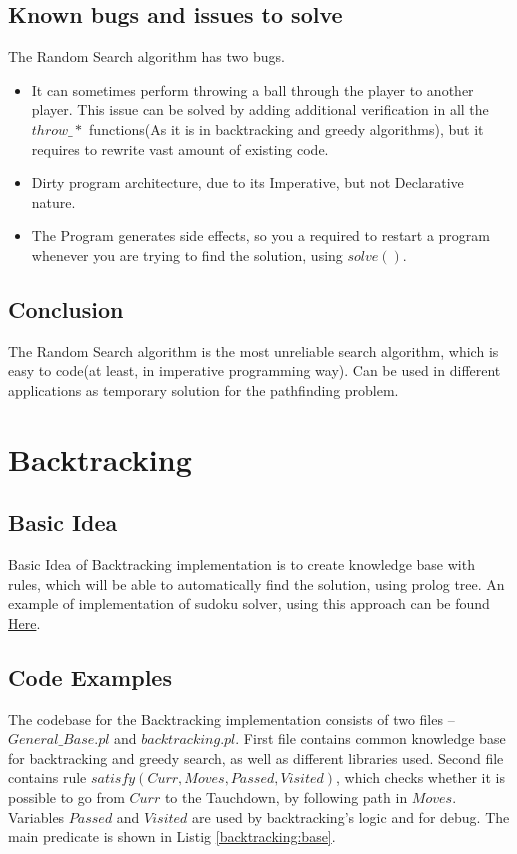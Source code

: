 \documentclass[a4apper,11pt]{article}
\begin{document}
\subsection{Known bugs and issues to solve}
The Random Search algorithm has two bugs.
\begin{itemize}
    \item It can sometimes perform throwing a ball through the player to another player. This issue can be solved by adding additional verification in all the $throw\_*$ functions(As it is in backtracking and greedy algorithms), but it requires to rewrite vast amount of existing code.
    \item Dirty program architecture, due to its Imperative, but not Declarative nature.
    \item The Program generates side effects, so you a required to restart a program whenever you are trying to find the solution, using $solve().$
\end{itemize}

\subsection{Conclusion}
The Random Search algorithm is the most unreliable search algorithm, which is easy to code(at least, in imperative programming way). Can be used in different applications as temporary solution for the pathfinding problem.

\newpage
\section{Backtracking}
\subsection{Basic Idea}

Basic Idea of Backtracking implementation is to create knowledge base with rules, which will be able to automatically find the solution, using prolog tree. An example of implementation of sudoku solver, using this approach can be found \href{https://www.youtube.com/watch?v=5KUdEZTu06o&list=PLEvH6T-1oh76ndUiFUDjIyrrL9FyrSKXw&index=4}{Here}.


\subsection{Code Examples}
The codebase for the Backtracking implementation consists of two files -- $General\_Base.pl$ and $backtracking.pl$. First file contains common knowledge base for backtracking and greedy search, as well as different libraries used. Second file contains rule $satisfy(Curr, Moves, Passed, Visited)$, which checks whether it is possible to go from $Curr$ to the Tauchdown, by following path in $Moves$. Variables $Passed$ and $Visited$ are used by backtracking's logic and for debug. The main predicate is shown in Listig \ref{backtracking:base}.
\end{document}
